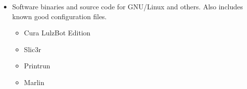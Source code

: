 \begin{itemize}
\item Software binaries and source code for GNU/Linux and others. Also includes known good configuration files.
\begin{itemize} %
\item{Cura LulzBot Edition}
\item Slic3r
\item Printrun
\item Marlin
\end{itemize} %

\end{itemize}

